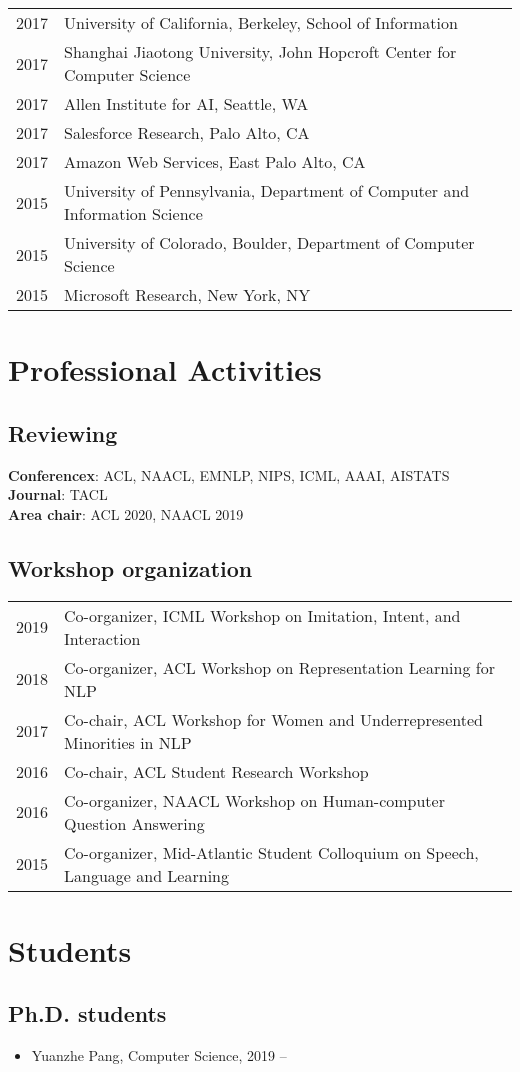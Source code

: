 \documentclass[a4paper,11pt]{article}
\begin{document}
\begin{longtable}{rl}
    2017 & University of California, Berkeley, School of Information \\
    2017 & Shanghai Jiaotong University, John Hopcroft Center for Computer Science \\
    2017 & Allen Institute for AI, Seattle, WA \\
    2017 & Salesforce Research, Palo Alto, CA \\
    2017 & Amazon Web Services, East Palo Alto, CA \\
    2015 & University of Pennsylvania, Department of Computer and Information Science \\
    2015 & University of Colorado, Boulder, Department of Computer Science \\
    2015 & Microsoft Research, New York, NY \\
\end{longtable}

\section{Professional Activities}
\subsection{Reviewing}
\textbf{Conferencex}: ACL, NAACL, EMNLP, NIPS, ICML, AAAI, AISTATS \\
\textbf{Journal}: TACL \\
\textbf{Area chair}: ACL 2020, NAACL 2019

\subsection{Workshop organization}
\begin{longtable}{rl}
2019 & Co-organizer, ICML Workshop on Imitation, Intent, and Interaction \\
2018 & Co-organizer, ACL Workshop on Representation Learning for NLP \\
2017 & Co-chair, ACL Workshop for Women and Underrepresented Minorities in NLP \\
2016 & Co-chair, ACL Student Research Workshop \\
2016 & Co-organizer, NAACL Workshop on Human-computer Question Answering \\
2015 & Co-organizer, Mid-Atlantic Student Colloquium on Speech, Language and Learning
\end{longtable}

\section{Students}
\subsection{Ph.D. students}
\begin{itemize}
    \item Yuanzhe Pang, Computer Science, 2019 --
\end{itemize}
\end{document}

